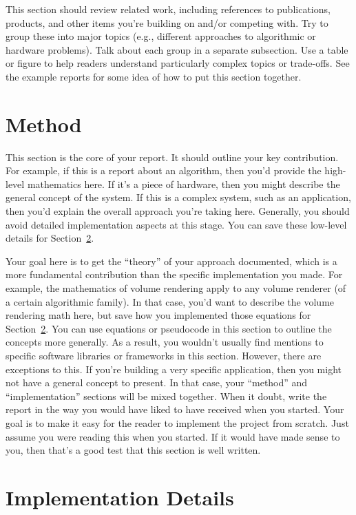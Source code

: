 \documentclass[acmtog,nonacm]{acmart}
\begin{document}
This section should review related work, including references to publications, products, and other items you're building on and/or competing with. Try to group these into major topics (e.g., different approaches to algorithmic or hardware problems). Talk about each group in a separate subsection. Use a table or figure to help readers understand particularly complex topics or trade-offs. See the example reports for some idea of how to put this section together.

\section{Method}
\label{sec:method}

This section is the core of your report. It should outline your key contribution. For example, if this is a report about an algorithm, then you'd provide the high-level mathematics here. If it's a piece of hardware, then you might describe the general concept of the system. If this is a complex system, such as an application, then you'd explain the overall approach you're taking here. Generally, you should avoid detailed implementation aspects at this stage. You can save these low-level details for Section~\ref{sec:implementation}. 

Your goal here is to get the ``theory'' of your approach documented, which is a more fundamental contribution than the specific implementation you made. For example, the mathematics of volume rendering apply to any volume renderer (of a certain algorithmic family). In that case, you'd want to describe the volume rendering math here, but save how you implemented those equations for Section~\ref{sec:implementation}. You can use equations or pseudocode in this section to outline the concepts more generally. As a result, you wouldn't usually find mentions to specific software libraries or frameworks in this section. However, there are exceptions to this. If you're building a very specific application, then you might not have a general concept to present. In that case, your ``method'' and ``implementation'' sections will be mixed together. When it doubt, write the report in the way you would have liked to have received when you started. Your goal is to make it easy for the reader to implement the project from scratch. Just assume you were reading this when you started. If it would have made sense to you, then that's a good test that this section is well written.

\section{Implementation Details}
\label{sec:implementation}
\end{document}
